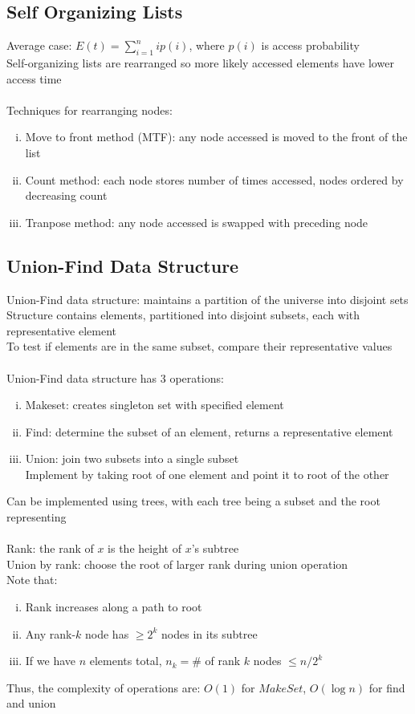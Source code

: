 \documentclass{article}
\begin{document}
		\subsection{Self Organizing Lists}
			Average case: $E(t) = \sum_{i = 1}^n ip(i)$, where $p(i)$ is access probability \\
			Self-organizing lists are rearranged so more likely accessed elements have lower access time \\
			\\
			Techniques for rearranging nodes:
			\begin{enumerate}[(i)]
				\item Move to front method (MTF): any node accessed is moved to the front of the list
				\item Count method: each node stores number of times accessed, nodes ordered by decreasing count
				\item Tranpose method: any node accessed is swapped with preceding node
				\end{enumerate}
		\subsection{Union-Find Data Structure}
			Union-Find data structure: maintains a partition of the universe into disjoint sets \\
			Structure contains elements, partitioned into disjoint subsets, each with representative element \\
			To test if elements are in the same subset, compare their representative values \\
			\\
			Union-Find data structure has 3 operations:
			\begin{enumerate}[(i)]
				\item Makeset: creates singleton set with specified element
				\item Find: determine the subset of an element, returns a representative element
				\item Union: join two subsets into a single subset \\
				Implement by taking root of one element and point it to root of the other
				\end{enumerate}
			Can be implemented using trees, with each tree being a subset and the root representing \\
			\\
			Rank: the rank of $x$ is the height of $x$'s subtree \\
			Union by rank: choose the root of larger rank during union operation \\
			Note that:
			\begin{enumerate}[(i)]
				\item Rank increases along a path to root
				\item Any rank-$k$ node has $\geq 2^k$ nodes in its subtree
				\item If we have $n$ elements total, $n_k = \#$ of rank $k$ nodes $\leq n/2^k$
				\end{enumerate}
			Thus, the complexity of operations are: $O(1)$ for $MakeSet$, $O(\log{n})$ for find and union
		\clearpage
\end{document}
